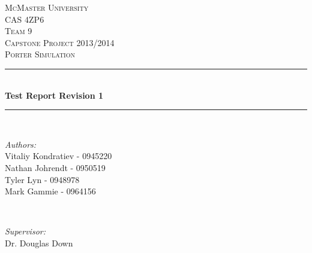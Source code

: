 \documentclass[paper=letter, fontsize=10pt]{scrartcl}
\numberwithin{equation}{section}		%
\numberwithin{figure}{section}			%
\numberwithin{table}{section}				%
\begin{document}
\begin{titlepage}

\newcommand{\HRule}{\rule{\linewidth}{0.5mm}} %
\newcommand{\authors}{\shortstack{Vitaliy Kondratiev,\\Nathan Johrendt,\\Tyler Lyn,\\Mark Gammie}}

\begin{center}
 

\textsc{\LARGE McMaster University}\\[1.5cm] %
\textsc{\Large CAS 4ZP6}\\[0.5cm]
\textsc{\Large Team 9} \\[0.5cm]
\textsc{\Large Capstone Project 2013/2014}\\[0.5cm] %
\textsc{\large Porter Simulation}\\[0.5cm] %


\HRule \\[0.4cm]
{ \huge \bfseries Test Report Revision 1}\\[0.4cm] %
\HRule \\[1.5cm]
 

\begin{minipage}{0.4\textwidth}
\begin{flushleft} \large
\emph{Authors:}\\
Vitaliy Kondratiev - 0945220\\
Nathan Johrendt - 0950519\\
Tyler Lyn - 0948978\\
Mark Gammie - 0964156
\end{flushleft}
\end{minipage}
~
\begin{minipage}{0.4\textwidth}
\begin{flushright} \large
\emph{Supervisor:} \\
Dr. Douglas Down %
\end{flushright}
\end{minipage}\\[4cm]


\end{center}
\end{titlepage}
\end{document}
